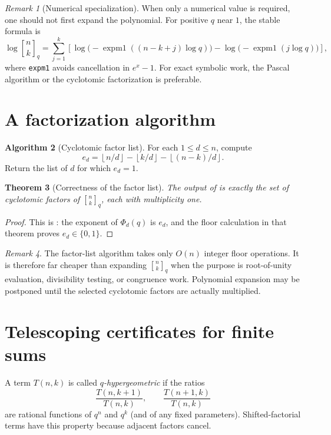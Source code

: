 \documentclass[11pt,oneside,openany]{book}
\newtheorem{theorem}{Theorem}[chapter]
\theoremstyle{definition}
\newtheorem{algorithm}[theorem]{Algorithm}
\theoremstyle{remark}
\newtheorem{remark}[theorem]{Remark}
\newcommand{\qbinom}[2]{\genfrac{[}{]}{0pt}{}{#1}{#2}_{q}}
\newcommand{\floor}[1]{\left\lfloor #1\right\rfloor}
\begin{document}
\begin{remark}[Numerical specialization]
When only a numerical value is required, one should not first expand the polynomial.  For positive $q$ near $1$, the stable formula is
\[
 \log\qbinom nk
 =\sum_{j=1}^{k}
 \left[\log\bigl(-\operatorname{expm1}((n-k+j)\log q)\bigr)
      -\log\bigl(-\operatorname{expm1}(j\log q)\bigr)\right],
\]
where \texttt{expm1} avoids cancellation in $e^x-1$.  For exact symbolic work, the Pascal algorithm or the cyclotomic factorization is preferable.
\end{remark}

\section{A factorization algorithm}

\begin{algorithm}[Cyclotomic factor list]\label{alg:cyclotomic-list}
For each $1\le d\le n$, compute
\[
 e_d=\floor{n/d}-\floor{k/d}-\floor{(n-k)/d}.
\]
Return the list of $d$ for which $e_d=1$.
\end{algorithm}

\begin{theorem}[Correctness of the factor list]\label{thm:cyclotomic-list-correct}
The output of  is exactly the set of cyclotomic factors of $\qbinom nk$, each with multiplicity one.
\end{theorem}

\begin{proof}
This is : the exponent of $\Phi_d(q)$ is $e_d$, and the floor calculation in that theorem proves $e_d\in\{0,1\}$.
\end{proof}

\begin{remark}
The factor-list algorithm takes only $O(n)$ integer floor operations.  It is therefore far cheaper than expanding $\qbinom nk$ when the purpose is root-of-unity evaluation, divisibility testing, or congruence work.  Polynomial expansion may be postponed until the selected cyclotomic factors are actually multiplied.
\end{remark}

\section{Telescoping certificates for finite sums}

A term $T(n,k)$ is called \emph{$q$-hypergeometric} if the ratios
\[
 \frac{T(n,k+1)}{T(n,k)},
 \qquad
 \frac{T(n+1,k)}{T(n,k)}
\]
are rational functions of $q^n$ and $q^k$ (and of any fixed parameters).  Shifted-factorial terms have this property because adjacent factors cancel.
\end{document}
